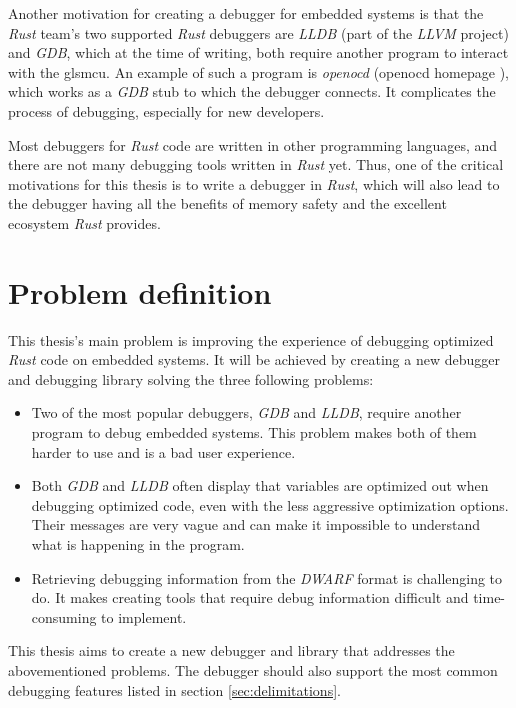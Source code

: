 Another motivation for creating a debugger for embedded systems is that the \emph{Rust} team's two supported \emph{Rust} debuggers are \emph{LLDB} (part of the \emph{LLVM} project) and \emph{GDB}, which at the time of writing, both require another program to interact with the gls{mcu}.
An example of such a program is \emph{openocd} (openocd homepage \cite{openocd}), which works as a \emph{GDB} stub to which the debugger connects.
It complicates the process of debugging, especially for new developers.


Most debuggers for \emph{Rust} code are written in other programming languages, and there are not many debugging tools written in \emph{Rust} yet.
Thus, one of the critical motivations for this thesis is to write a debugger in \emph{Rust}, which will also lead to the debugger having all the benefits of memory safety and the excellent ecosystem \emph{Rust} provides.


\section{Problem definition} \label{sec:problemDef}
This thesis's main problem is improving the experience of debugging optimized \emph{Rust} code on embedded systems.
It will be achieved by creating a new debugger and debugging library solving the three following problems:

\begin{itemize}
  \item Two of the most popular debuggers, \emph{GDB} and \emph{LLDB}, require another program to debug embedded systems.
This problem makes both of them harder to use and is a bad user experience.

\item Both \emph{GDB} and \emph{LLDB} often display that variables are optimized out when debugging optimized code, even with the less aggressive optimization options.
Their messages are very vague and can make it impossible to understand what is happening in the program.

\item Retrieving debugging information from the \emph{DWARF} format is challenging to do.
It makes creating tools that require debug information difficult and time-consuming to implement.
\end{itemize}

This thesis aims to create a new debugger and library that addresses the abovementioned problems.
The debugger should also support the most common debugging features listed in section \ref{sec:delimitations}.


